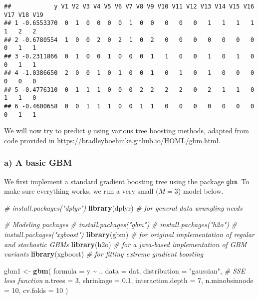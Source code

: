 \documentclass[
]{article}
\newenvironment{Shaded}{\begin{snugshade}}{\end{snugshade}}
\newcommand{\AttributeTok}[1]{\textcolor[rgb]{0.13,0.29,0.53}{#1}}
\newcommand{\CommentTok}[1]{\textcolor[rgb]{0.56,0.35,0.01}{\textit{#1}}}
\newcommand{\DecValTok}[1]{\textcolor[rgb]{0.00,0.00,0.81}{#1}}
\newcommand{\FloatTok}[1]{\textcolor[rgb]{0.00,0.00,0.81}{#1}}
\newcommand{\FunctionTok}[1]{\textcolor[rgb]{0.13,0.29,0.53}{\textbf{#1}}}
\newcommand{\NormalTok}[1]{#1}
\newcommand{\OtherTok}[1]{\textcolor[rgb]{0.56,0.35,0.01}{#1}}
\newcommand{\SpecialCharTok}[1]{\textcolor[rgb]{0.81,0.36,0.00}{\textbf{#1}}}
\newcommand{\StringTok}[1]{\textcolor[rgb]{0.31,0.60,0.02}{#1}}
\begin{document}
\begin{verbatim}
##            y V1 V2 V3 V4 V5 V6 V7 V8 V9 V10 V11 V12 V13 V14 V15 V16 V17 V18 V19
## 1 -0.6553370  0  1  0  0  0  0  1  0  0   0   0   0   1   1   1   1   1   2   2
## 2 -0.6780554  1  0  0  2  0  2  1  0  2   0   0   0   0   0   0   0   0   1   1
## 3 -0.2311866  0  1  0  0  1  0  0  0  1   1   0   0   1   0   1   0   0   1   1
## 4 -1.0386650  2  0  0  1  0  1  0  0  1   0   1   0   1   0   0   0   0   0   0
## 5 -0.4776310  0  1  1  1  0  0  0  2  2   2   2   0   2   1   1   0   1   1   0
## 6 -0.4600658  0  0  1  1  1  0  0  1  1   0   0   0   0   0   0   0   0   1   1
\end{verbatim}

We will now try to predict \(y\) using various tree boosting methods,
adapted from code provided in
\url{https://bradleyboehmke.github.io/HOML/gbm.html}.

\hypertarget{a-a-basic-gbm}{%
\subsubsection{a) A basic GBM}\label{a-a-basic-gbm}}

We first implement a standard gradient boosting tree using the package
\texttt{gbm}. To make sure everything works, we run a very small
(\(M=3\)) model below.

\begin{Shaded}
\begin{Highlighting}[]
\CommentTok{\# install.packages("dplyr")}
\FunctionTok{library}\NormalTok{(dplyr)    }\CommentTok{\# for general data wrangling needs}

\CommentTok{\# Modeling packages}
\CommentTok{\# install.packages("gbm")}
\CommentTok{\# install.packages("h2o")}
\CommentTok{\# install.packages("xgboost")}
\FunctionTok{library}\NormalTok{(gbm)      }\CommentTok{\# for original implementation of regular and stochastic GBMs}
\FunctionTok{library}\NormalTok{(h2o)      }\CommentTok{\# for a java{-}based implementation of GBM variants}
\FunctionTok{library}\NormalTok{(xgboost)  }\CommentTok{\# for fitting extreme gradient boosting}

\NormalTok{gbm1 }\OtherTok{\textless{}{-}} \FunctionTok{gbm}\NormalTok{(}
  \AttributeTok{formula =}\NormalTok{ y }\SpecialCharTok{\textasciitilde{}}\NormalTok{ .,}
  \AttributeTok{data =}\NormalTok{ dat,}
  \AttributeTok{distribution =} \StringTok{"gaussian"}\NormalTok{,  }\CommentTok{\# SSE loss function}
  \AttributeTok{n.trees =} \DecValTok{3}\NormalTok{,}
  \AttributeTok{shrinkage =} \FloatTok{0.1}\NormalTok{,}
  \AttributeTok{interaction.depth =} \DecValTok{7}\NormalTok{,}
  \AttributeTok{n.minobsinnode =} \DecValTok{10}\NormalTok{,}
  \AttributeTok{cv.folds =} \DecValTok{10}
\NormalTok{)}
\end{Highlighting}
\end{Shaded}
\end{document}

